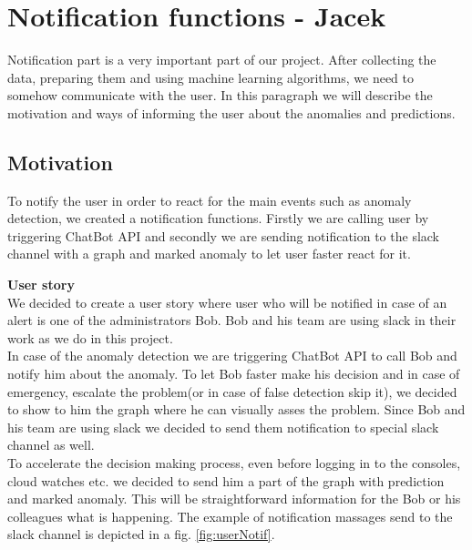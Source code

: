 \section{Notification functions - Jacek}

Notification part is a very important part of our project. After collecting the data, preparing them and using machine learning algorithms, we need to somehow communicate with the user. In this paragraph we will describe the motivation and ways of informing the user about the anomalies and predictions.

\subsection{Motivation}
To notify the user in order to react for the main events such as anomaly detection, we created a notification functions. Firstly we are calling user by triggering ChatBot API and secondly we are sending notification to the slack channel with a graph and marked anomaly to let user faster react for it.

\textbf{User story} \\
We decided to create a user story where user who will be notified in case of an alert is one of the administrators Bob. Bob and his team are using slack in their work as we do in this project. \\
In case of the anomaly detection we are triggering ChatBot API to call Bob and notify him about the anomaly. To let Bob faster make his decision and in case of emergency, escalate the problem(or in case of false detection skip it), we decided to show to him the graph where he can visually asses the problem. Since Bob and his team are using slack we decided to send them notification to special slack channel as well. \\
To accelerate the decision making process, even before logging in to the consoles, cloud watches etc. we decided to send him a part of the graph with prediction and marked anomaly. This will be straightforward information for the Bob or his colleagues what is happening. The example of notification massages send to the slack channel is depicted in a fig. \ref{fig:userNotif}.

